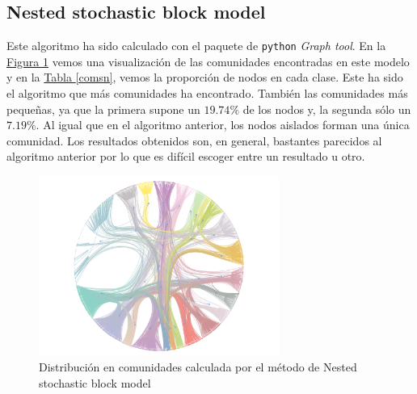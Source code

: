 \documentclass[10pt,a4paper,spanish]{article}
\numberwithin{equation}{section} %
\numberwithin{figure}{section} %
\numberwithin{table}{section} %
\begin{document}
\subsection{Nested stochastic block model}
Este algoritmo ha sido calculado con el paquete de \texttt{python} \textit{Graph tool}. En la \hyperref[nested]{Figura \ref*{nested}} vemos una visualización de las comunidades encontradas en este modelo y en la \hyperref[comsb]{Tabla \ref*{comsn}}, vemos la proporción de nodos en cada clase. Este ha sido el algoritmo que más comunidades ha encontrado. También las comunidades más pequeñas, ya que la primera supone un $19.74\%$ de los nodos y, la segunda sólo un $7.19\%$. Al igual que en el algoritmo anterior, los nodos aislados forman una única comunidad. Los resultados obtenidos son, en general, bastantes parecidos al algoritmo anterior por lo que es difícil escoger entre un resultado u otro.

\begin{figure}[!h]
    \centering
    \includegraphics[width=0.7\textwidth]{nested}
    \caption{Distribución en comunidades calculada por el método de Nested stochastic block model}
    \label{nested}
\end{figure}
\end{document}
